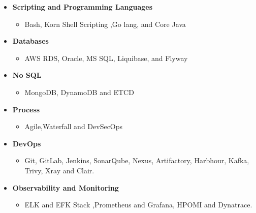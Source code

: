 \documentclass{scrartcl}
\begin{document}
\begin{cv}{}
{	\begin{itemize}
		\item \textbf{Scripting and Programming Languages}
		\begin{itemize}
			\item Bash, Korn Shell Scripting ,Go lang, and Core Java
		\end{itemize}
		\item \textbf{Databases}
		\begin{itemize}
			\item AWS RDS, Oracle, MS SQL, Liquibase, and Flyway
		\end{itemize}
		\item \textbf{No SQL}
		\begin{itemize}
			\item MongoDB, DynamoDB and ETCD
		\end{itemize}
		\item \textbf{Process}
		\begin{itemize} 
			\item Agile,Waterfall and DevSecOps
		\end{itemize}
		\item \textbf{DevOps} 	
		\begin{itemize} 
			\item Git, GitLab, Jenkins, SonarQube, Nexus, Artifactory, Harbhour, Kafka, Trivy, Xray and Clair.
		\end{itemize}
		\item \textbf{Observability and Monitoring} 
		\begin{itemize}
			\item ELK and EFK Stack ,Prometheus and Grafana, HPOMI and Dynatrace.
		\end{itemize}
	\end{itemize}
}

\vspace{1em} %

\vspace{2em} %
\noindent{}\vspace{1em}



\end{cv}
\end{document}
